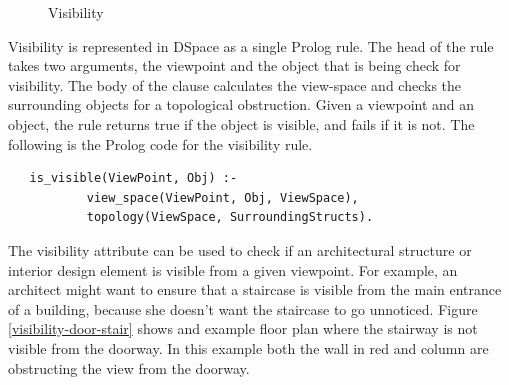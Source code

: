 \documentclass[12pt]{ucthesis}
\begin{document}
\begin{figure}[H]
 \centering
  \hspace{10 mm}
 \caption{Visibility}
\label{Visibility}
\end{figure}



Visibility is represented in DSpace as a single Prolog rule. The head of the rule takes two arguments, the viewpoint and the object that is being check for visibility. The body of the clause calculates the view-space and checks the surrounding objects for a topological obstruction. Given a viewpoint and an object, the rule returns true if the object is visible, and fails if it is not. The following is the Prolog code for the visibility rule.

\begin{verbatim}
   is_visible(ViewPoint, Obj) :- 
           view_space(ViewPoint, Obj, ViewSpace),
           topology(ViewSpace, SurroundingStructs).
\end{verbatim}

The visibility attribute can be used to check if an architectural structure or interior design element is visible from a given viewpoint. For example, an architect might want to ensure that a staircase is visible from the main entrance of a building, because she doesn't want the staircase to go unnoticed. Figure \ref{visibility-door-stair} shows and example floor plan where the stairway is not visible from the doorway. In this example both the wall in red and column are obstructing the view from the doorway. 
\end{document}
